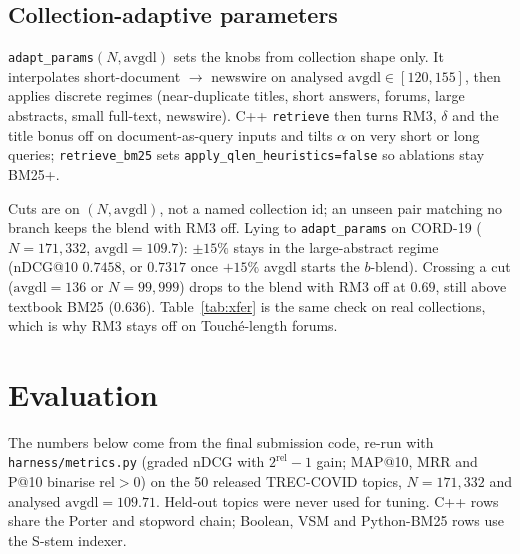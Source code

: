 \documentclass[10pt,a4paper]{article}
\begin{document}
\subsection{Collection-adaptive parameters}
\texttt{adapt\_params}$(N,\mathrm{avgdl})$ sets the knobs from collection shape only.
It interpolates short-document $\to$ newswire on analysed $\mathrm{avgdl}\in[120,155]$,
then applies discrete regimes (near-duplicate titles, short answers, forums, large
abstracts, small full-text, newswire). C++ \texttt{retrieve} then turns RM3, $\delta$
and the title bonus off on document-as-query inputs and tilts $\alpha$ on very short
or long queries; \texttt{retrieve\_bm25} sets \texttt{apply\_qlen\_heuristics=false}
so ablations stay BM25+.

Cuts are on $(N,\mathrm{avgdl})$, not a named collection id; an unseen pair matching
no branch keeps the blend with RM3 off. Lying to \texttt{adapt\_params} on CORD-19
($N{=}171{,}332$, $\mathrm{avgdl}{=}109.7$): $\pm15\%$ stays in the large-abstract
regime (nDCG@10 $0.7458$, or $0.7317$ once $+15\%$ avgdl starts the $b$-blend).
Crossing a cut ($\mathrm{avgdl}{=}136$ or $N{=}99{,}999$) drops to the blend with RM3
off at $0.69$, still above textbook BM25 ($0.636$). Table~\ref{tab:xfer} is the same
check on real collections, which is why RM3 stays off on Touch\'e-length forums.

\section{Evaluation}
The numbers below come from the final submission code, re-run with
\texttt{harness/metrics.py} (graded nDCG with $2^{\mathrm{rel}}-1$ gain; MAP@10, MRR and
P@10 binarise $\mathrm{rel}>0$) on the 50 released TREC-COVID topics,
$N{=}171{,}332$ and analysed $\mathrm{avgdl}{=}109.71$. Held-out topics were never used
for tuning. C++ rows share the Porter and stopword chain; Boolean, VSM and Python-BM25
rows use the S-stem indexer.
\end{document}
